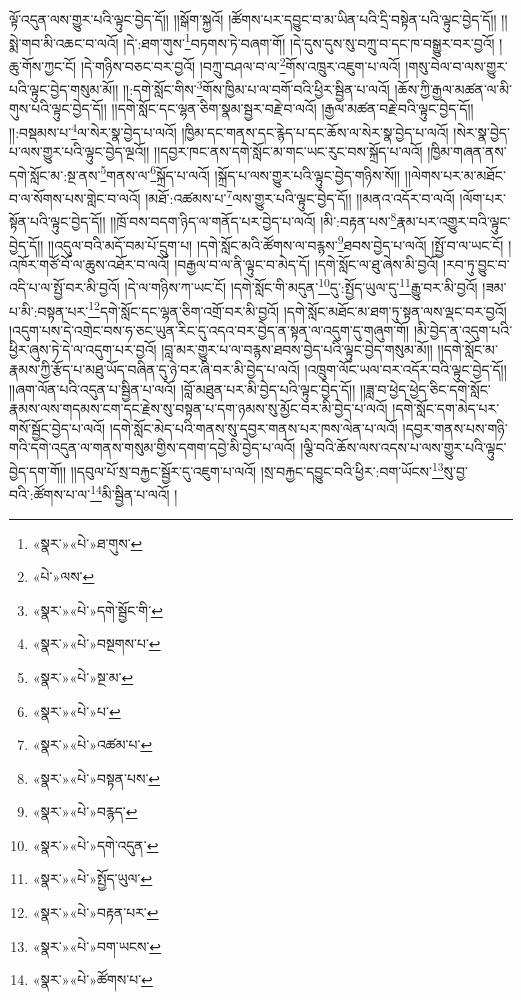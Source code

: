 ལྟོ་འདུན་ལས་གྱུར་པའི་ལྟུང་བྱེད་དོ།། །།སྒོག་སྐྱའོ། །ཚོགས་པར་དབྱུང་བ་མ་ཡིན་པའི་དྲི་བསྟེན་པའི་ལྟུང་བྱེད་དོ།། །།སྨེ་གབ་མི་འཆང་བ་ལའོ། །དེ་:ཐག་གུས་\footnote{«སྣར་»«པེ་»ཐ་གུས་}བཏགས་ཏེ་བཞག་གོ། །དེ་དུས་དུས་སུ་བཀྲུ་བ་དང་ཁ་བསྒྱུར་བར་བྱའོ། །ཆུ་གོས་ཀྱང་ངོ། །དེ་གཉིས་བཅང་བར་བྱའོ། །བཀྲུ་བཤལ་བ་ལ་\footnote{«པེ་»ལས་}གོས་འཁྲུར་འཇུག་པ་ལའོ། །གསུ་བེལ་བ་ལས་གྱུར་པའི་ལྟུང་བྱེད་གསུམ་མོ།། །།:དགེ་སློང་གིས་\footnote{«སྣར་»«པེ་»དགེ་སྦྱོང་གི་}གོས་ཁྱིམ་པ་ལ་བགོ་བའི་ཕྱིར་སྦྱིན་པ་ལའོ། །ཆོས་ཀྱི་རྒྱལ་མཚན་ལ་མི་གུས་པའི་ལྟུང་བྱེད་དོ།། །།དགེ་སློང་དང་ལྷན་ཅིག་སྣམ་སྦྱར་བརྗེ་བ་ལའོ། །རྒྱལ་མཚན་བརྗེ་བའི་ལྟུང་བྱེད་དོ།། །།:བསྡམས་པ་\footnote{«སྣར་»«པེ་»བསྔགས་པ་}ལ་སེར་སྣ་བྱེད་པ་ལའོ། །ཁྱིམ་དང་གནས་དང་རྙེད་པ་དང་ཆོས་ལ་སེར་སྣ་བྱེད་པ་ལའོ། །སེར་སྣ་བྱེད་པ་ལས་གྱུར་པའི་ལྟུང་བྱེད་ལྔའོ།། །།དབྱར་ཁང་ནས་དགེ་སློང་མ་གང་ཡང་རུང་བས་སྐྲོད་པ་ལའོ། །ཁྱིམ་གཞན་ནས་དགེ་སློང་མ་:སྔ་ནས་\footnote{«སྣར་»«པེ་»སྔ་མ་}གནས་ལ་\footnote{«སྣར་»«པེ་»པ་}སྐྲོད་པ་ལའོ། །སྐྲོད་པ་ལས་གྱུར་པའི་ལྟུང་བྱེད་གཉིས་སོ།། །།ལེགས་པར་མ་མཐོང་བ་ལ་སོགས་པས་གླེང་བ་ལའོ། །མཐོ་:འཚམས་པ་\footnote{«སྣར་»«པེ་»འཚམ་པ་}ལས་གྱུར་པའི་ལྟུང་བྱེད་དོ།། །།མནའ་འདོར་བ་ལའོ། །ལོག་པར་སྟོན་པའི་ལྟུང་བྱེད་དོ།། །།ཁྲོ་བས་བདག་ཉིད་ལ་གནོད་པར་བྱེད་པ་ལའོ། །མི་:བརྟན་པས་\footnote{«སྣར་»«པེ་»བསྟན་པས་}རྣམ་པར་འགྱུར་བའི་ལྟུང་བྱེད་དོ།། །།འདུལ་བའི་མདོ་བམ་པོ་དྲུག་པ། །དགེ་སློང་མའི་ཚོགས་ལ་བརྙས་\footnote{«སྣར་»«པེ་»བརྙད་}ཐབས་བྱེད་པ་ལའོ། །སྤྱོ་བ་ལ་ཡང་ངོ། །འཁོར་གཙོ་བོ་ལ་ཆུས་འཐོར་བ་ལའོ། །བརྒྱལ་བ་ལ་ནི་ལྟུང་བ་མེད་དོ། །དགེ་སློང་ལ་ཐུ་ཞེས་མི་བྱའོ། །རབ་ཏུ་བྱུང་བ་འདི་པ་ལ་སྤྱོ་བར་མི་བྱའོ། །དེ་ལ་གཉིས་ཀ་ཡང་ངོ། །དགེ་སློང་གི་མདུན་\footnote{«སྣར་»«པེ་»དགེ་འདུན་}དུ་:སྤྱོད་ཡུལ་དུ་\footnote{«སྣར་»«པེ་»སྤྱོད་ཡུལ་}རྒྱུ་བར་མི་བྱའོ། །ཟམ་པ་མི་:བསྟན་པར་\footnote{«སྣར་»«པེ་»བརྟན་པར་}དགེ་སློང་དང་ལྷན་ཅིག་འགྲོ་བར་མི་བྱའོ། །དགེ་སློང་མཐོང་མ་ཐག་ཏུ་སྟན་ལས་ལྡང་བར་བྱའོ། །འདུག་པས་དེ་འགྲེང་བས་ཧ་ཅང་ཡུན་རིང་དུ་འདའ་བར་བྱེད་ན་སྟན་ལ་འདུག་དུ་གཞུག་གོ། །མི་བྱེད་ན་འདུག་པའི་ཕྱིར་ཞུས་ཏེ་དེ་ལ་འདུག་པར་བྱའོ། །བླ་མར་གྱུར་པ་ལ་བརྙས་ཐབས་བྱེད་པའི་ལྟུང་བྱེད་གསུམ་མོ།། །།དགེ་སློང་མ་རྣམས་ཀྱི་རྩོད་པ་མཐུ་ཡོད་བཞིན་དུ་ཉེ་བར་ཞི་བར་མི་བྱེད་པ་ལའོ། །འཁྲུག་ལོང་ཡལ་བར་འདོར་བའི་ལྟུང་བྱེད་དོ།། །།ཞག་ལོན་པའི་འདུན་པ་སྦྱིན་པ་ལའོ། །བློ་མཐུན་པར་མི་བྱེད་པའི་ལྟུང་བྱེད་དོ།། །།ཟླ་བ་ཕྱེད་ཕྱེད་ཅིང་དགེ་སློང་རྣམས་ལས་གདམས་ངག་དང་རྗེས་སུ་བསྟན་པ་དག་ཉམས་སུ་མྱོང་བར་མི་བྱེད་པ་ལའོ། །དགེ་སློང་དག་མེད་པར་གསོ་སྦྱོང་བྱེད་པ་ལའོ། །དགེ་སློང་མེད་པའི་གནས་སུ་དབྱར་གནས་པར་ཁས་ལེན་པ་ལའོ། །དབྱར་གནས་པས་གཉི་གའི་དགེ་འདུན་ལ་གནས་གསུམ་གྱིས་དགག་དབྱེ་མི་བྱེད་པ་ལའོ། །ལྕི་བའི་ཆོས་ལས་འདས་པ་ལས་གྱུར་པའི་ལྟུང་བྱེད་དག་གོ།། །།དབུལ་པོ་སྲ་བརྐྱང་སྦྱོར་དུ་འཇུག་པ་ལའོ། །སྲ་བརྐྱང་དབྱུང་བའི་ཕྱིར་:བག་ཡོངས་\footnote{«སྣར་»«པེ་»བག་ཡངས་}སུ་བྱ་བའི་:ཚོགས་པ་ལ་\footnote{«སྣར་»«པེ་»ཚོགས་པ་}མི་སྦྱིན་པ་ལའོ། །
